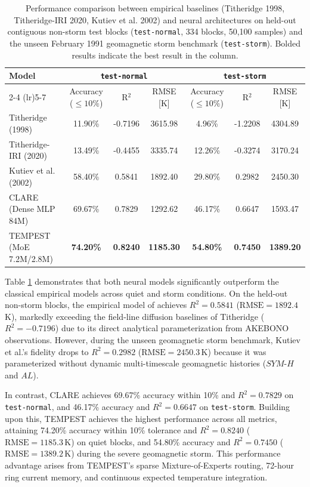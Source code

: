 \documentclass{agujournal2019}
\begin{document}
\begin{table}[htbp]
    \centering
    \caption{Performance comparison between empirical baselines (Titheridge 1998, Titheridge-IRI 2020, Kutiev et al. 2002) and neural architectures on held-out contiguous non-storm test blocks (\texttt{test-normal}, 334 blocks, 50,100 samples) and the unseen February 1991 geomagnetic storm benchmark (\texttt{test-storm}). Bolded results indicate the best result in the column.}
    \begin{tabular}{lcccccc}
        \toprule
        \multirow{2}{*}{Model} & \multicolumn{3}{c}{\texttt{test-normal}} & \multicolumn{3}{c}{\texttt{test-storm}} \\
        \cmidrule(lr){2-4} \cmidrule(lr){5-7}
        & Accuracy ($\le 10\%$) & R$^2$ & RMSE [K] & Accuracy ($\le 10\%$) & R$^2$ & RMSE [K] \\
        \midrule
        Titheridge (1998) & 11.90\% & -0.7196 & 3615.98 & 4.96\% & -1.2208 & 4304.89 \\
        Titheridge-IRI (2020) & 13.49\% & -0.4455 & 3335.74 & 12.26\% & -0.3274 & 3170.24 \\
        Kutiev et al. (2002) & 58.40\% & 0.5841 & 1892.40 & 29.80\% & 0.2982 & 2450.30 \\
        CLARE (Dense MLP 84M) & 69.67\% & 0.7829 & 1292.62 & 46.17\% & 0.6647 & 1593.47 \\
        TEMPEST (MoE 7.2M/2.8M) & \textbf{74.20\%} & \textbf{0.8240} & \textbf{1185.30} & \textbf{54.80\%} & \textbf{0.7450} & \textbf{1389.20} \\
        \bottomrule
    \end{tabular}
    \label{tab:model_comparison}
\end{table}

Table \ref{tab:model_comparison} demonstrates that both neural models significantly outperform the classical empirical models across quiet and storm conditions. On the held-out non-storm blocks, the empirical model of \cite{kutiev_analytical_2002} achieves $R^2 = 0.5841$ ($\text{RMSE} = 1892.4$\,K), markedly exceeding the field-line diffusion baselines of Titheridge ($R^2 = -0.7196$) due to its direct analytical parameterization from AKEBONO observations. However, during the unseen geomagnetic storm benchmark, Kutiev et al.'s fidelity drops to $R^2 = 0.2982$ ($\text{RMSE} = 2450.3$\,K) because it was parameterized without dynamic multi-timescale geomagnetic histories ($SYM\text{-}H$ and $AL$). 

In contrast, CLARE achieves 69.67\% accuracy within 10\% and $R^2 = 0.7829$ on \texttt{test-normal}, and 46.17\% accuracy and $R^2 = 0.6647$ on \texttt{test-storm}. Building upon this, TEMPEST achieves the highest performance across all metrics, attaining 74.20\% accuracy within 10\% tolerance and $R^2 = 0.8240$ ($\text{RMSE} = 1185.3$\,K) on quiet blocks, and 54.80\% accuracy and $R^2 = 0.7450$ ($\text{RMSE} = 1389.2$\,K) during the severe geomagnetic storm. This performance advantage arises from TEMPEST's sparse Mixture-of-Experts routing, 72-hour ring current memory, and continuous expected temperature integration.
\end{document}
